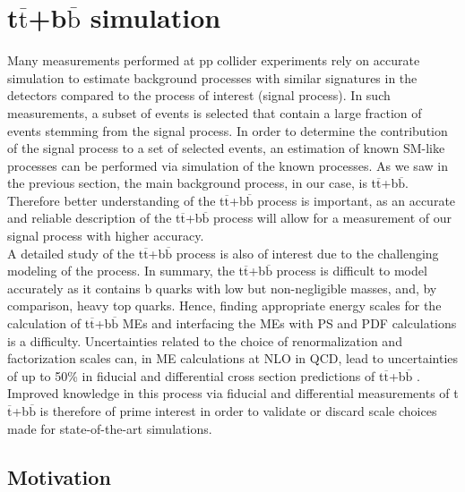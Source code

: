 \section{\label{se:analysis_tt+bb}t$\overline{\text{t}}$+b$\overline{\text{b}}$ simulation}
\noindent Many measurements performed at pp collider experiments rely on accurate simulation to estimate background processes with similar signatures in the detectors compared to the process of interest (signal process). In such measurements, a subset of events is selected that contain a large fraction of events stemming from the signal process. In order to determine the contribution of the signal process to a set of selected events, an estimation of known SM-like processes can be performed via simulation of the known processes. As we saw in the previous section, the main background process, in our case, is t$\overline{\text{t}}$+b$\overline{\text{b}}$. Therefore better understanding of the t$\overline{\text{t}}$+b$\overline{\text{b}}$ process is important, as an accurate and reliable description of the t$\overline{\text{t}}$+b$\overline{\text{b}}$ process will allow for a measurement of our signal process with higher accuracy.\\
\indent A detailed study of the t$\overline{\text{t}}$+b$\overline{\text{b}}$ process is also of interest due to the challenging modeling of the process. In summary, the t$\overline{\text{t}}$+b$\overline{\text{b}}$ process is difficult to model accurately as it contains b quarks with low but non-negligible masses, and, by comparison, heavy top quarks. Hence, finding appropriate energy scales for the calculation of t$\overline{\text{t}}$+b$\overline{\text{b}}$ MEs and interfacing the MEs with PS and PDF calculations is a difficulty. Uncertainties related to the choice of renormalization and factorization scales can, in ME calculations at NLO in QCD, lead to uncertainties of up to 50\% in fiducial and differential cross section predictions of t$\overline{\text{t}}$+b$\overline{\text{b}}$ \cite{Tom}. Improved knowledge in this process via fiducial and differential measurements of t$\overline{\text{t}}$+b$\overline{\text{b}}$ is therefore of prime interest in order to validate or discard scale choices made for state-of-the-art simulations.

\subsection{\label{motivation}Motivation}



